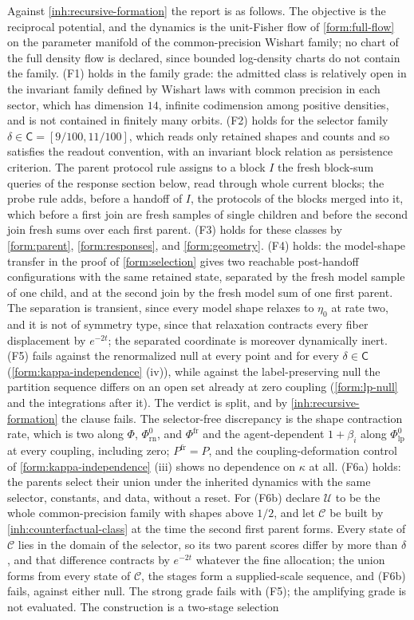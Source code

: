 Against \cref{inh:recursive-formation} the report is as follows. The objective is the reciprocal potential, and the dynamics is the unit-Fisher flow of \cref{form:full-flow} on the parameter manifold of the common-precision Wishart family; no chart of the full density flow is declared, since bounded log-density charts do not contain the family. (F1) holds in the family grade: the admitted class is relatively open in the invariant family defined by Wishart laws with common precision in each sector, which has dimension $14$, infinite codimension among positive densities, and is not contained in finitely many orbits. (F2) holds for the selector family $\delta\in\mathsf C=[9/100,11/100]$, which reads only retained shapes and counts and so satisfies the readout convention, with an invariant block relation as persistence criterion. The parent protocol rule assigns to a block $I$ the fresh block-sum queries of the response section below, read through whole current blocks; the probe rule adds, before a handoff of $I$, the protocols of the blocks merged into it, which before a first join are fresh samples of single children and before the second join fresh sums over each first parent. (F3) holds for these classes by \cref{form:parent}, \cref{form:responses}, and \cref{form:geometry}. (F4) holds: the model-shape transfer in the proof of \cref{form:selection} gives two reachable post-handoff configurations with the same retained state, separated by the fresh model sample of one child, and at the second join by the fresh model sum of one first parent. The separation is transient, since every model shape relaxes to $\eta_0$ at rate two, and it is not of symmetry type, since that relaxation contracts every fiber displacement by $e^{-2t}$; the separated coordinate is moreover dynamically inert. (F5) fails against the renormalized null at every point and for every $\delta\in\mathsf C$ (\cref{form:kappa-independence} (iv)), while against the label-preserving null the partition sequence differs on an open set already at zero coupling (\cref{form:lp-null} and the integrations after it). The verdict is split, and by \cref{inh:recursive-formation} the clause fails. The selector-free discrepancy is the shape contraction rate, which is two along $\Phi$, $\Phi^0_{\mathrm{rn}}$, and $\Phi^{\mathrm{fr}}$ and the agent-dependent $1+\beta_i$ along $\Phi^0_{\mathrm{lp}}$ at every coupling, including zero; $P^{\mathrm{fr}}=P$, and the coupling-deformation control of \cref{form:kappa-independence} (iii) shows no dependence on $\kappa$ at all. (F6a) holds: the parents select their union under the inherited dynamics with the same selector, constants, and data, without a reset. For (F6b) declare $\mathcal U$ to be the whole common-precision family with shapes above $1/2$, and let $\mathcal C$ be built by \cref{inh:counterfactual-class} at the time the second first parent forms. Every state of $\mathcal C$ lies in the domain of the selector, so its two parent scores differ by more than $\delta$, and that difference contracts by $e^{-2t}$ whatever the fine allocation; the union forms from every state of $\mathcal C$, the stages form a supplied-scale sequence, and (F6b) fails, against either null. The strong grade fails with (F5); the amplifying grade is not evaluated. The construction is a two-stage selection 